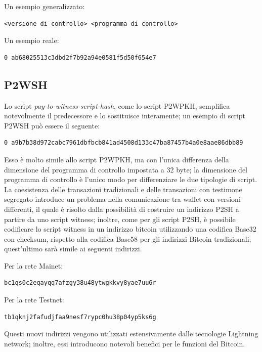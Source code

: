 Un esempio generalizzato:
\begin{lstlisting}[language=bitcoinscript, label={code:generalexamplep2wpkh}, caption={Esempio generale della struttura di uno script P2WPKH.}]
<versione di controllo> <programma di controllo>
\end{lstlisting}

Un esempio reale:
\begin{lstlisting}[language=bitcoinscript, label={code:xamplep2wpkh}, caption={Esempio reale di uno script P2WPKH.}]
0 ab68025513c3dbd2f7b92a94e0581f5d50f654e7
\end{lstlisting}

\subsection{P2WSH} \label{subsec:bitcoinScriptBitcoinCoreP2wsh}

Lo script \emph{pay-to-witness-script-hash}, come lo script P2WPKH, semplifica notevolmente il predecessore e lo sostituisce interamente; un esempio di script P2WSH può essere il seguente:
\begin{lstlisting}[language=bitcoinscript, label={code:examplep2wsh}, caption={Esempio di uno script P2WSH.}]
0 a9b7b38d972cabc7961dbfbcb841ad4508d133c47ba87457b4a0e8aae86dbb89
\end{lstlisting}
Esso è molto simile allo script P2WPKH, ma con l’unica differenza della dimensione del programma di controllo impostata a 32 byte; la dimensione del programma di controllo è l’unico modo per differenziare le due tipologie di script.
La coesistenza delle transazioni tradizionali e delle transazioni con testimone segregato introduce  un problema nella comunicazione tra wallet con versioni differenti, il quale è risolto dalla possibilità di costruire un indirizzo P2SH a partire da uno script witness; inoltre, come per gli script P2SH, è possibile codificare lo script witness in un indirizzo bitcoin utilizzando una codifica Base32 con checksum, rispetto alla codifica Base58 per gli indirizzi Bitcoin tradizionali; quest’ultimo sarà simile ai seguenti indirizzi.

Per la rete Mainet:
\begin{lstlisting}[language=bitcoinscript, label={code:examplep2wsh}, caption={Address base32 della rete mainet.}]
bc1qs0c2eqayqq7afzgy38u48ytwgkkvy8yae7uu6r
\end{lstlisting}
Per la rete Testnet:
\begin{lstlisting}[language=bitcoinscript, label={code:examplep2wsh}, caption={Address base32 della rete testnet.}]
tb1qknj2fafudjfaa9nesf7rypc0hu38p04yp5ks6g
\end{lstlisting}
Questi nuovi indirizzi vengono utilizzati estensivamente dalle tecnologie Lightning network; inoltre, essi introducono notevoli benefici per le funzioni del Bitcoin.


